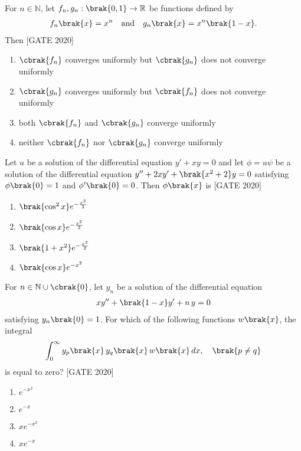    \item  For $n \in \mathbb{N}$, let $f_n, g_n : \brak{0, 1} \to \mathbb{R}$ be functions defined by
    \begin{align*}
    f_n\brak{x} = x^n \quad \text{and} \quad g_n\brak{x} = x^n \brak{1 - x}.
    \end{align*}
    Then
    \hfill{[GATE 2020]}\begin{enumerate}
        \item $\cbrak{f_n}$ converges uniformly but $\cbrak{g_n}$ does not converge uniformly
        \item $\cbrak{g_n}$ converges uniformly but $\cbrak{f_n}$ does not converge uniformly
        \item both $\cbrak{f_n}$ and $\cbrak{g_n}$ converge uniformly
        \item neither $\cbrak{f_n}$ nor $\cbrak{g_n}$ converge uniformly
    \end{enumerate}

    \item  Let $u$ be a solution of the differential equation $y' + xy = 0$ and let $\phi = u\psi$ be a solution of the differential equation $y'' + 2xy' + \brak{x^2 + 2}y = 0$ satisfying $\phi\brak{0} = 1$ and $\phi'\brak{0} = 0$. Then $\phi\brak{x}$ is
    \hfill{[GATE 2020]}\begin{multicols}{2}\begin{enumerate}
        \item $\brak{\cos^2 x}e^{-\frac{x^2}{2}}$
        \item $\brak{\cos x}e^{-\frac{x^2}{2}}$
        \item $\brak{1 + x^2}e^{-\frac{x^2}{2}}$
        \item $\brak{\cos x}e^{-x^2}$
    \end{enumerate}\end{multicols}
     \item For $n \in \mathbb{N} \cup \cbrak{0}$, let $y_n$ be a solution of the differential equation
    \begin{align*}
    xy'' + \brak{1 - x}y' + n \, y = 0
    \end{align*}
    satisfying $y_n\brak{0} = 1$. For which of the following functions $w\brak{x}$, the integral
    \begin{align*}
    \int_0^{\infty} y_p\brak{x} \, y_q\brak{x} \, w\brak{x} \, dx, \quad \brak{p \neq q}
    \end{align*}
    is equal to zero?
    \hfill{[GATE 2020]}\begin{multicols}{2}\begin{enumerate}
        \item $e^{-x^2}$
        \item $e^{-x}$
        \item $x e^{-x^2}$
        \item $x e^{-x}$
    \end{enumerate}\end{multicols}

